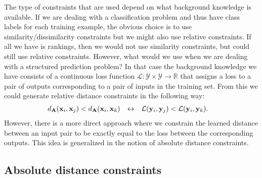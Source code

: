 The type of constraints that are used depend on what background knowledge is available.
If we are dealing with a classification problem and thus have class labels for each training example, the obvious choice is to use similarity/dissimilarity constraints but we might also use relative constraints.
If all we have is rankings, then we would not use similarity constraints, but could still use relative constraints.
However, what would we use when we are dealing with a structured prediction problem?
In that case the background knowledge we have consists of a continuous loss function $\mathcal{L}: \mathcal{Y} \times \mathcal{Y} \rightarrow \mathbb{R}$  that assigns a loss to a pair of outputs corresponding to a pair of inputs in the training set.
From this we could generate relative distance constraints in the following way:
\begin{align}
d_{\mathbf{A}}(\mathbf{x}_i, \mathbf{x}_j) &< d_{\mathbf{A}}(\mathbf{x}_i, \mathbf{x}_k) &\leftrightarrow&&\mathcal{L}(\mathbf{y}_i, \mathbf{y}_j) &< \mathcal{L}(\mathbf{y}_i, \mathbf{y}_k).
\end{align}
However, there is a more direct approach where we constrain the learned distance between an input pair to be exactly equal to the loss between the corresponding outputs.
This idea is generalized in the notion of absolute distance constraints.



\subsection{Absolute distance constraints}


